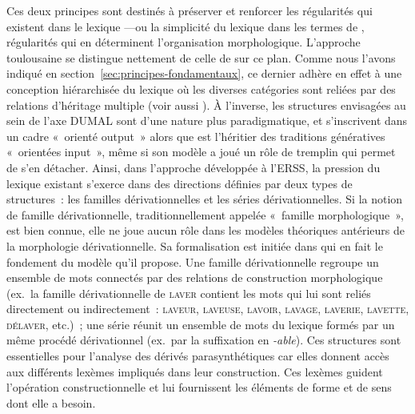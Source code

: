 \documentclass[output=paper]{langsci/langscibook}
\begin{document}
Ces deux principes sont destinés à préserver et renforcer les régularités qui existent dans le lexique ---ou la simplicité du lexique dans les termes de \cite{Dell70}, régularités qui en déterminent l'organisation morphologique.  L'approche toulousaine se distingue nettement de celle de \cite{Fradin03} sur ce plan.  Comme nous l'avons indiqué en section~\ref{sec:principes-fondamentaux}, ce dernier adhère en effet à une conception hiérarchisée du lexique où les diverses catégories sont reliées par des relations d'héritage multiple (voir aussi \citet{Koenig99,Davis00}).  À l'inverse, les structures envisagées au sein de l'axe DUMAL sont d'une nature plus paradigmatique, et s'inscrivent dans un cadre «~orienté output~» alors que \cite{Fradin03} est l'héritier des traditions génératives «~orientées input~», même si son modèle a joué un rôle de tremplin qui permet de s'en détacher. Ainsi, dans l'approche développée à l'ERSS, la pression du lexique existant s'exerce dans des directions définies par deux types de structures~: les familles dérivationnelles et les séries dérivationnelles.  Si la notion de famille dérivationnelle, traditionnellement appelée «~famille morphologique~», est bien connue, elle ne joue aucun rôle dans les modèles théoriques antérieurs de la morphologie dérivationnelle.  Sa formalisation est initiée dans \cite{hathout2011.dumal} qui en fait le fondement du modèle qu'il propose.  Une famille dérivationnelle regroupe un ensemble de mots connectés par des relations de construction morphologique (ex.\ la famille dérivationnelle de \textsc{laver} contient les mots qui lui sont reliés directement ou indirectement~: \textsc{laveur}, \textsc{laveuse}, \textsc{lavoir}, \textsc{lavage}, \textsc{laverie}, \textsc{lavette}, \textsc{délaver}, etc.)~; une série réunit un ensemble de mots du lexique formés par un même procédé dérivationnel (ex.\ par la suffixation en \emph{\mbox{-able}}).
%
Ces structures sont essentielles pour l'analyse des dérivés parasynthétiques car elles donnent accès aux différents lexèmes impliqués dans leur construction. Ces lexèmes guident l'opération constructionnelle et lui fournissent les éléments de forme et de sens dont elle a besoin.
\end{document}
